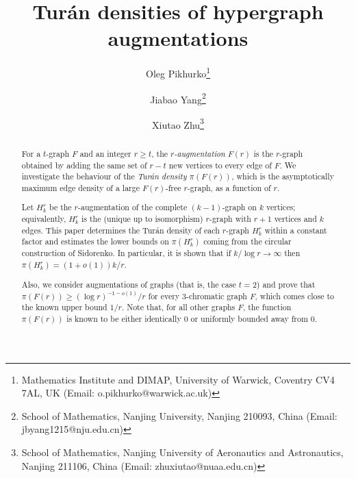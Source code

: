 \documentclass[12pt,a4paper]{article}
\title{Tur\'an densities of hypergraph augmentations}
\author{
Oleg Pikhurko\thanks{Mathematics Institute and DIMAP, University of Warwick, Coventry CV4 7AL, UK (Email:
o.pikhurko@warwick.ac.uk)}\and Jiabao Yang\thanks{School of Mathematics, Nanjing University, Nanjing 210093, China (Email: jbyang1215@nju.edu.cn)}\and 
Xiutao Zhu\thanks{School of Mathematics, Nanjing University of Aeronautics and Astronautics, Nanjing 211106, China (Email: zhuxiutao@nuaa.edu.cn)}
}
\date{}
\numberwithin{equation}{section}
\theoremstyle{definition}
\theoremstyle{remark}
\newcommand{\hide}[1]{{\color{DarkGreen}#1}}
\renewcommand{\hide}[1]{}
\newcommand{\me}{\mathrm{e}}
\begin{document}
	
	
\maketitle
\vspace{-1.2em}

\begin{abstract}
For a $t$-graph $F$ and an integer $r\ge t$, the \emph{$r$-augmentation} $F(r)$ is the $r$-graph obtained by adding the same set of $r-t$ new vertices to every edge of $F$. We investigate the behaviour of the \emph{Tur\'an density $\pi(F(r))$}, which is the asymptotically maximum edge density of a large $F(r)$-free $r$-graph, as a function of $r$.

Let $H_k^r$ be the $r$-augmentation of the complete $(k-1)$-graph on $k$ vertices; equivalently, $H_k^r$ is
the (unique up to isomorphism) $r$-graph with $r+1$ vertices and $k$ edges. This paper
determines the Tur\'an density of each $r$-graph $H_k^r$ within a constant factor
and estimates the lower bounds on $\pi(H_k^r)$ coming from the circular construction of Sidorenko. In particular, it is shown that if $k/\log r\to\infty$ then $\pi(H_k^r)=(1+o(1))k/r$.

Also, we consider augmentations of graphs (that is, the case $t=2$) and 
prove that $\pi(F(r))\ge(\log r)^{-1-o(1)}/r$ for every 3-chromatic graph $F$, which comes close to the known upper bound $1/r$. Note that, for all other graphs $F$, the function $\pi(F(r))$ is known to be either identically 0 or uniformly bounded away from 0.




\hide{
The \emph{Tur\'an density} $\pi(H)$ of an $r$-graph $H$ is the asymptotically maximum edge density of a large $H$-free $r$-graph.
We present results in two directions as follows.
 
 
 
Let $H_k^r$ be the (unique up to isomorphism) $r$-graph with $r+1$ vertices and $k$ edges. We 
determine the Tur\'an density of each $r$-graph $H_k^r$ within a constant factor.
Also, we estimate the lower bounds on $\pi(H_k^r)$ coming from the circular construction of Sidorenko when $k=k(r)$ grows with $r$; in particular, we show that if $k/\log r\to\infty$ then $\pi(H_k^r)=(1+o(1))k/r$.

}
\end{abstract}
\end{document}

